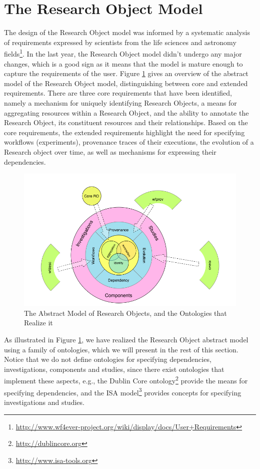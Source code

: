 \section{The Research Object Model}
\label{sec:romodel}

The design of the Research Object model was informed by a systematic analysis of requirements expressed by scientists from the life sciences and astronomy fields\footnote{\url{http://www.wf4ever-project.org/wiki/display/docs/User+Requirements}}. In the last year, the Research Object model didn't undergo any major changes, which is a good sign as it means that the model is mature enough to capture the requirements of the user. Figure \ref{fig:wm_abstract} gives an overview of the abstract model of the Research Object model, distinguishing between core and extended requirements. There are three core requirements that have been identified, namely a mechanism for uniquely identifying Research Objects, a means for aggregating resources within a Research Object, and the ability to annotate the Research Object, its constituent resources and their relationships. Based on the core requirements, the extended requirements highlight the need for specifying workflows (experiments), provenance traces of their executions, the evolution of a Research object over time, as well as mechanisms for expressing their dependencies. 


\begin{figure}[ht]
  \centering
  \includegraphics[width=.8\textwidth]{Figures/ro-model.png}
  \caption{The Abstract Model of Research Objects, and the Ontologies that Realize it}
  \label{fig:wm_abstract}
\end{figure}

As illustrated in Figure \ref{fig:wm_abstract}, we have realized the Research Object abstract model using  a family of ontologies, which we will present in the rest of this section. Notice that we do not define ontologies for specifying dependencies, investigations, components and studies, since there exist ontologies that implement these aspects, e.g., the Dublin Core ontology\footnote{\url{http://dublincore.org}} provide the means for specifying dependencies, and the ISA model\footnote{\url{http://www.isa-tools.org}} provides concepts for specifying investigations and studies.


